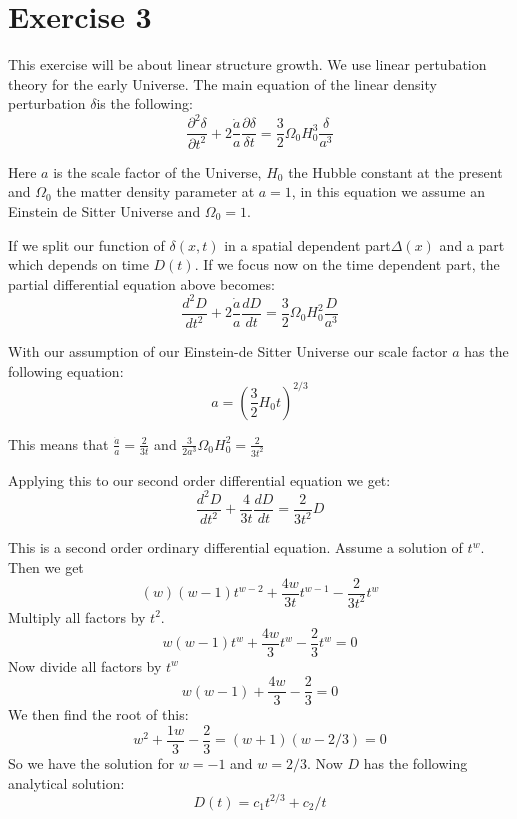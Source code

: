\section{Exercise 3}
This exercise will be about linear structure growth. We use linear pertubation theory for the early Universe. The main equation of the linear density perturbation $\delta $is the following:
\begin{equation}
\frac{\partial^2\delta}{\partial t^2}+2\frac{\dot{a}}{a}\frac{\partial\delta}{\delta t}=\frac{3}{2}\Omega_0H_0^3\frac{\delta}{a^3}
\end{equation}

Here $a$ is the scale factor of the Universe, $H_0$ the Hubble constant at the present and $\Omega_0$ the matter density parameter at $a=1$, in this equation we assume an Einstein de Sitter Universe and $\Omega_0=1$.

If we split our function of $\delta(x,t)$ in a spatial dependent part$\Delta(x)$ and a part which depends on time $D(t)$. If we focus now on the time dependent part, the partial differential equation above becomes:
\begin{equation}
\frac{d^2 D}{dt^2}+2\frac{\dot{a}}{a}\frac{dD}{d t}=\frac{3}{2}\Omega_0H_0^2\frac{D}{a^3}
\end{equation}

With our assumption of our Einstein-de Sitter Universe our scale factor $a$ has the following equation:
\begin{equation}
a=\left(\frac{3}{2}H_0t\right)^{2/3}
\end{equation}

This means that $\frac{\dot{a}}{a}=\frac{2}{3t}$ and $\frac{3}{2a^3}\Omega_0H_0^2=\frac{2}{3t^2}$

Applying this to our second order differential equation we get:
\begin{equation}
\frac{d^2 D}{dt^2}+\frac{4}{3t}\frac{dD}{d t}=\frac{2}{3t^2} D
\end{equation}

This is a second order ordinary differential equation.
Assume a solution of $t^{w}$. Then we get
\begin{equation}
    (w)(w-1)t^{w-2}+\frac{4w}{3t}t^{w-1}-\frac{2}{3t^{2}}t^{w}
\end{equation}
Multiply all factors by $t^2$.
\begin{equation}
    w(w-1)t^{w}+\frac{4w}{3}t^{w}-\frac{2}{3}t^{w}=0
\end{equation}
Now divide all factors by $t^{w}$
\begin{equation}
    w(w-1)+\frac{4w}{3}-\frac{2}{3}=0
\end{equation}
We then find the root of this:
\begin{equation}
    w^2+\frac{1w}{3}-\frac{2}{3}=(w+1)(w-2/3)=0
\end{equation}
So we have the solution for $w=-1$ and $w=2/3$.
Now $D$ has the following analytical solution:
\begin{equation}
D(t)=c_1t^{2/3}+c_2/t
\end{equation}

